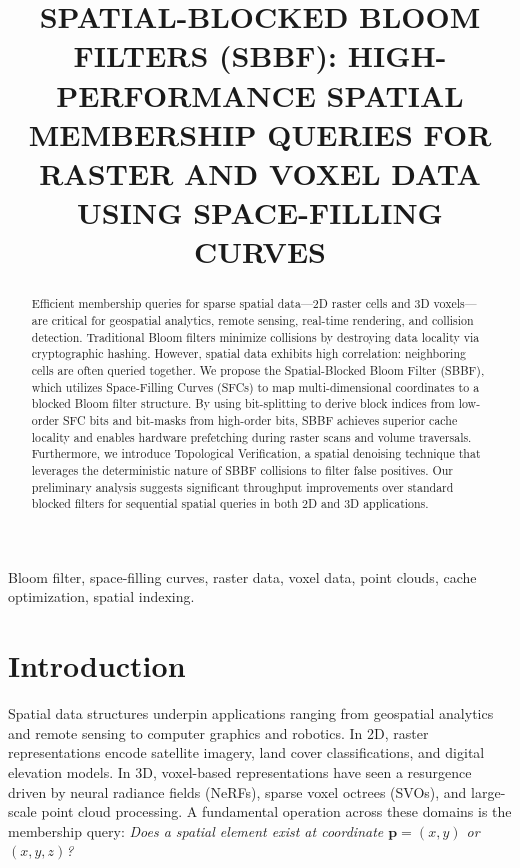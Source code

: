 \documentclass[conference,a4paper]{IEEEtran}
\begin{document}
\title{\uppercase{Spatial-Blocked Bloom Filters (SBBF): High-Performance Spatial Membership Queries for Raster and Voxel Data using Space-Filling Curves}}

\author{
\and
{}
}

\maketitle
\begin{abstract}
Efficient membership queries for sparse spatial data---2D raster cells and 3D voxels---are critical for geospatial analytics, remote sensing, real-time rendering, and collision detection. Traditional Bloom filters minimize collisions by destroying data locality via cryptographic hashing. However, spatial data exhibits high correlation: neighboring cells are often queried together. We propose the Spatial-Blocked Bloom Filter (SBBF), which utilizes Space-Filling Curves (SFCs) to map multi-dimensional coordinates to a blocked Bloom filter structure. By using bit-splitting to derive block indices from low-order SFC bits and bit-masks from high-order bits, SBBF achieves superior cache locality and enables hardware prefetching during raster scans and volume traversals. Furthermore, we introduce Topological Verification, a spatial denoising technique that leverages the deterministic nature of SBBF collisions to filter false positives. Our preliminary analysis suggests significant throughput improvements over standard blocked filters for sequential spatial queries in both 2D and 3D applications.
\end{abstract}

\begin{IEEEkeywords}
Bloom filter, space-filling curves, raster data, voxel data, point clouds, cache optimization, spatial indexing.
\end{IEEEkeywords}

\section{Introduction}
Spatial data structures underpin applications ranging from geospatial analytics and remote sensing to computer graphics and robotics. In 2D, raster representations encode satellite imagery, land cover classifications, and digital elevation models. In 3D, voxel-based representations have seen a resurgence driven by neural radiance fields (NeRFs), sparse voxel octrees (SVOs), and large-scale point cloud processing. A fundamental operation across these domains is the membership query: \textit{Does a spatial element exist at coordinate $\mathbf{p} = (x, y)$ or $(x, y, z)$?}
\end{document}
